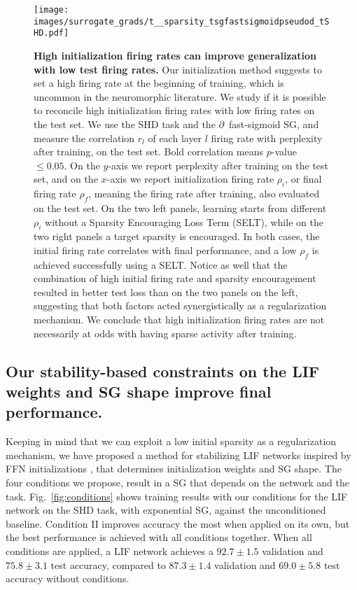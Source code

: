 \begin{figure}
    \texttt{[image: images/surrogate\_grads/t\_\_sparsity\_tsgfastsigmoidpseudod\_tSHD.pdf]}
        \caption{\textbf{High  initialization firing rates can improve generalization with low test firing rates.} Our initialization method suggests to set a high firing rate at the beginning of training, which is uncommon in the neuromorphic literature. We study if it is possible to reconcile high initialization firing rates with low firing rates on the test set. We use the SHD task and the $\partial$~fast-sigmoid SG, and measure the correlation $r_l$ of each layer $l$ firing rate with perplexity after training, on the test set. Bold correlation means $p$-value $ \leq 0.05$. On the $y$-axis we report perplexity after training on the test set, and on the $x$-axis we report initialization firing rate $\rho_i$, or final firing rate $\rho_f$, meaning the firing rate after training, also evaluated on the test set. On the two left panels, learning starts from different $\rho_i$ without a Sparsity Encouraging Loss Term (SELT), while on the two right panels a target sparsity is encouraged. In both cases, the initial firing rate correlates with final performance, and a low $\rho_f$ is achieved successfully using a SELT. Notice as well that the combination of high initial firing rate and sparsity encouragement resulted in better test loss than on the two panels on the left, suggesting that both factors acted synergistically as a regularization mechanism. We conclude that high initialization firing rates are not necessarily at odds with having sparse activity after training.}
    \label{fig:sparsity}
\end{figure}


\subsection{Our stability-based constraints on the LIF weights and SG shape improve final performance.}
\label{sec:conditions}

Keeping in mind that we can exploit a low initial sparsity as a regularization mechanism, we have proposed a method for stabilizing LIF networks inspired by FFN initializations \cite{glorot2010understanding, he2015delving}, that determines initialization weights and SG shape. The four conditions we propose, result in a SG that depends on the network and the task.
Fig.~\ref{fig:conditions} shows training results with our conditions for the LIF network on the SHD task, with exponential SG, against the unconditioned baseline. Condition II improves accuracy the most when applied on its own, but the best performance is achieved with all conditions together. When all conditions are applied, a LIF network achieves a $92.7\pm1.5$ validation and $75.8\pm3.1$ test accuracy, compared to $87.3\pm1.4$ validation and $69.0\pm5.8$ test accuracy without conditions.


